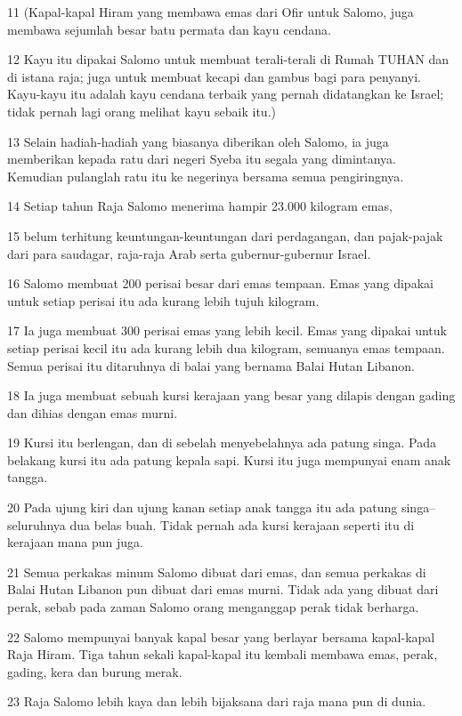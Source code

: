 \par 11 (Kapal-kapal Hiram yang membawa emas dari Ofir untuk Salomo, juga membawa sejumlah besar batu permata dan kayu cendana.
\par 12 Kayu itu dipakai Salomo untuk membuat terali-terali di Rumah TUHAN dan di istana raja; juga untuk membuat kecapi dan gambus bagi para penyanyi. Kayu-kayu itu adalah kayu cendana terbaik yang pernah didatangkan ke Israel; tidak pernah lagi orang melihat kayu sebaik itu.)
\par 13 Selain hadiah-hadiah yang biasanya diberikan oleh Salomo, ia juga memberikan kepada ratu dari negeri Syeba itu segala yang dimintanya. Kemudian pulanglah ratu itu ke negerinya bersama semua pengiringnya.
\par 14 Setiap tahun Raja Salomo menerima hampir 23.000 kilogram emas,
\par 15 belum terhitung keuntungan-keuntungan dari perdagangan, dan pajak-pajak dari para saudagar, raja-raja Arab serta gubernur-gubernur Israel.
\par 16 Salomo membuat 200 perisai besar dari emas tempaan. Emas yang dipakai untuk setiap perisai itu ada kurang lebih tujuh kilogram.
\par 17 Ia juga membuat 300 perisai emas yang lebih kecil. Emas yang dipakai untuk setiap perisai kecil itu ada kurang lebih dua kilogram, semuanya emas tempaan. Semua perisai itu ditaruhnya di balai yang bernama Balai Hutan Libanon.
\par 18 Ia juga membuat sebuah kursi kerajaan yang besar yang dilapis dengan gading dan dihias dengan emas murni.
\par 19 Kursi itu berlengan, dan di sebelah menyebelahnya ada patung singa. Pada belakang kursi itu ada patung kepala sapi. Kursi itu juga mempunyai enam anak tangga.
\par 20 Pada ujung kiri dan ujung kanan setiap anak tangga itu ada patung singa--seluruhnya dua belas buah. Tidak pernah ada kursi kerajaan seperti itu di kerajaan mana pun juga.
\par 21 Semua perkakas minum Salomo dibuat dari emas, dan semua perkakas di Balai Hutan Libanon pun dibuat dari emas murni. Tidak ada yang dibuat dari perak, sebab pada zaman Salomo orang menganggap perak tidak berharga.
\par 22 Salomo mempunyai banyak kapal besar yang berlayar bersama kapal-kapal Raja Hiram. Tiga tahun sekali kapal-kapal itu kembali membawa emas, perak, gading, kera dan burung merak.
\par 23 Raja Salomo lebih kaya dan lebih bijaksana dari raja mana pun di dunia.
